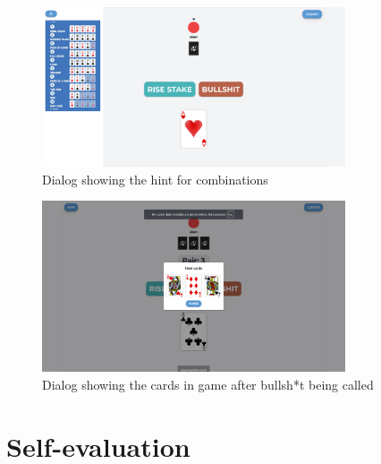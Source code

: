 \documentclass{scrartcl}
\begin{document}
\begin{figure}
      \centering
      \includegraphics[width=0.8\textwidth]{figures/hintScreenshot.png}
      \caption{Dialog showing the hint for combinations}
      \label{fig:screenshot7}
\end{figure}

\begin{figure}
      \centering
      \includegraphics[width=0.8\textwidth]{figures/cardsInGameScreenshot.png}
      \caption{Dialog showing the cards in game after bullsh*t being called}
      \label{fig:screenshot8}
\end{figure}

\newpage
\section{Self-evaluation}\label{self-evaluation}




\cite{adams1995hitchhiker} %
\end{document}
